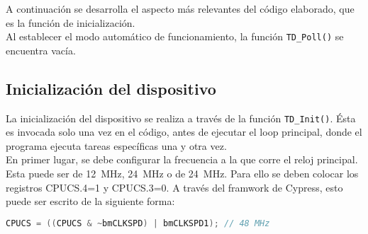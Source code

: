 A continuación se desarrolla el aspecto más relevantes del código elaborado, que es la función de inicialización.\\

Al establecer el modo automático de funcionamiento, la función \verb|TD_Poll()| se encuentra vacía.\\

\subsection{Inicialización del dispositivo}
	La inicialización del dispositivo se realiza a través de la función \verb|TD_Init()|. Ésta es invocada solo una vez en el código, antes de ejecutar el loop principal, donde el programa ejecuta tareas específicas una y otra vez.\\
	
	En primer lugar, se debe configurar la frecuencia a la que corre el reloj principal. Esta puede ser de \SI{12}{\mega\hertz}, \SI{24}{\mega\hertz} o de \SI{24}{\mega\hertz}. Para ello se deben colocar los registros CPUCS.4=1 y CPUCS.3=0. A través del framwork de Cypress, esto puede ser escrito de la siguiente forma:
	
	\begin{lstlisting}[language=C,backgroundcolor=\color{gray!30}]
	CPUCS = ((CPUCS & ~bmCLKSPD) | bmCLKSPD1); // 48 MHz
	\end{lstlisting}

